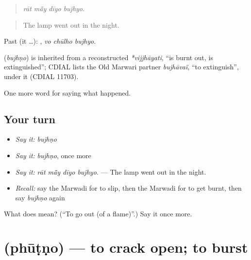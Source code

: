 \begin{quote}
   
\end{quote}

\begin{quote}
\emph{rāt mā̃y dīyo bujhyo.}
\end{quote}

\begin{quote}
The lamp went out in the night.
\end{quote}

Past (it …):   , \emph{vo chūlho bujhyo}.

\begin{cousinweb}
\textbf{} (\emph{bujhṇo}) is inherited from a reconstructed \emph{*vijjhāyati}, \textquotedblleft{}is burnt out, is extinguished\textquotedblright{}; CDIAL lists the Old Marwari partner \emph{bujhāvaï}, \textquotedblleft{}to extinguish\textquotedblright{}, under it (CDIAL 11703).
\end{cousinweb}

\begin{grammarlens}[title={What you've built}]
One more word for saying what happened.
\end{grammarlens}

\subsection*{Your turn}
\begin{itemize}
\raggedright
  \item \emph{Say it:} \emph{bujhṇo}
  \item \emph{Say it:} \emph{bujhṇo}, once more
  \item \emph{Say it:} \emph{rāt mā̃y dīyo bujhyo.} — The lamp went out in the night.
  \item \emph{Recall:} say the Marwadi for to slip, then the Marwadi for to get burnt, then say \emph{bujhṇo} again
\end{itemize}

\begin{tcolorbox}[breakable,colback=teal!4,colframe=teal!35!black,title={Before you move on}]
What does  mean? (\textquotedblleft{}To go out (of a flame)\textquotedblright{}.) Say it once more.
\end{tcolorbox}
\section[\texorpdfstring{\mw{फूटणो} (phūṭṇo)}{फूटणो (phūṭṇo)}]{ (phūṭṇo) — to crack open; to burst}

